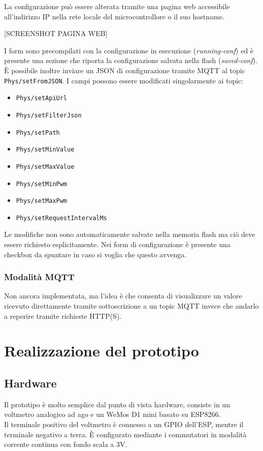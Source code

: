 \documentclass[12pt,a4paper]{report}
\begin{document}
La configurazione può essere alterata tramite una pagina web accessibile all'indirizzo IP nella rete locale del microcontrollore o il suo
hostname.

\vspace{4mm}
{[SCREENSHOT PAGINA WEB]}

\vspace{4mm}
I form sono precompilati con la configurazione in esecuzione (\emph{running-conf}) ed è presente una sezione che riporta la configurazione
salvata nella flash (\emph{saved-conf}).\\
È possibile inoltre inviare un JSON di configurazione tramite MQTT al topic \texttt{Phys/setFromJSON}. I campi possono essere modificati
singolarmente ai topic:
\begin{itemize}
  \item \texttt{Phys/setApiUrl}
  \item \texttt{Phys/setFilterJson}
  \item \texttt{Phys/setPath}
  \item \texttt{Phys/setMinValue}
  \item \texttt{Phys/setMaxValue}
  \item \texttt{Phys/setMinPwm}
  \item \texttt{Phys/setMaxPwm}
  \item \texttt{Phys/setRequestIntervalMs}
\end{itemize}

Le modifiche non sono automaticamente salvate nella memoria flash ma ciò deve essere richiesto esplicitamente. Nei form di configurazione
è presente una checkbox da spuntare in caso si voglia che questo avvenga.


\subsection{Modalità MQTT}
Non ancora implementata, ma l'idea è che consenta di visualizzare un valore ricevuto direttamente tramite sottoscrizione a un topic MQTT
invece che andarlo a reperire tramite richieste HTTP(S).

\chapter{Realizzazione del prototipo}

\section{Hardware}
Il prototipo è molto semplice dal punto di vista hardware, consiste in un voltmetro analogico ad ago e un WeMos D1 mini basato su ESP8266.\\
Il terminale positivo del voltmetro è connesso a un GPIO dell'ESP, mentre il terminale negativo a terra. È configurato mediante i
commutatori in modalità corrente continua con fondo scala a 3V.
\end{document}

